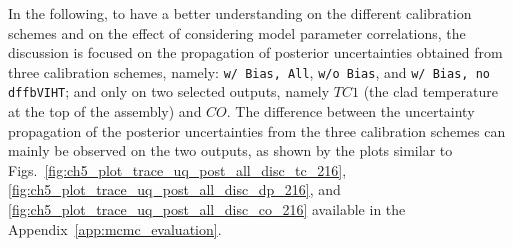 In the following, to have a better understanding on the different calibration schemes and on the effect of considering model parameter correlations, 
the discussion is focused on the propagation of posterior uncertainties obtained from three calibration schemes, namely: \texttt{w/ Bias, All}, \texttt{w/o Bias}, and \texttt{w/ Bias, no dffbVIHT}; 
and only on two selected outputs, namely $TC1$ (the clad temperature at the top of the assembly) and $CO$.
The difference between the uncertainty propagation of the posterior uncertainties from the three calibration schemes can mainly be observed on the two outputs,
as shown by the plots similar to Figs.~\ref{fig:ch5_plot_trace_uq_post_all_disc_tc_216}, \ref{fig:ch5_plot_trace_uq_post_all_disc_dp_216}, and \ref{fig:ch5_plot_trace_uq_post_all_disc_co_216} available in the Appendix~\ref{app:mcmc_evaluation}.


